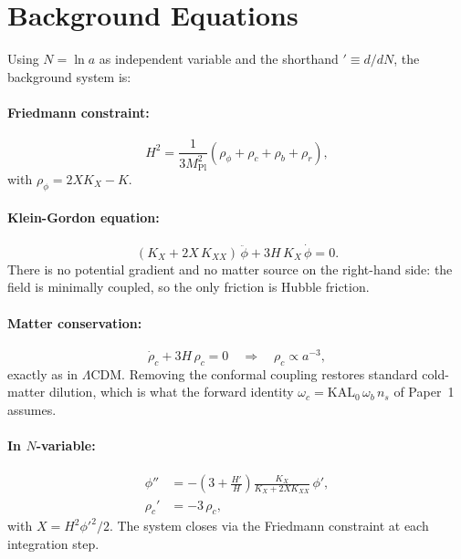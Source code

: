 \documentclass[12pt,a4paper]{article}
\newcommand{\KAL}{\mathrm{KAL}_0}
\newcommand{\Mpl}{M_{\mathrm{Pl}}}
\newcommand{\brac}[1]{\left(#1\right)}
\begin{document}
\section{Background Equations}
\label{sec:background}

Using $N = \ln a$ as independent variable and the shorthand
${}' \equiv d/dN$, the background system is:

\paragraph{Friedmann constraint:}
\begin{equation}
  H^2 = \frac{1}{3\Mpl^2}
        \brac{\rho_\phi + \rho_{c} + \rho_b + \rho_r},
  \label{eq:Friedmann}
\end{equation}
with $\rho_\phi = 2XK_X - K$.

\paragraph{Klein-Gordon equation:}
\begin{equation}
  \brac{K_X + 2X\,K_{XX}}\,\ddot\phi
  + 3H\,K_X\,\dot\phi
  = 0.
  \label{eq:KG}
\end{equation}
There is no potential gradient and no matter source on the right-hand
side: the field is minimally coupled, so the only friction is Hubble
friction.

\paragraph{Matter conservation:}
\begin{equation}
  \dot\rho_{c} + 3H\,\rho_{c} = 0
  \quad\Longrightarrow\quad
  \rho_{c} \propto a^{-3},
  \label{eq:rhoc}
\end{equation}
exactly as in $\Lambda$CDM.  Removing the conformal coupling restores
standard cold-matter dilution, which is what the forward identity
$\omega_c = \KAL\,\omega_b\,n_s$ of Paper~1 assumes.

\paragraph{In $N$-variable:}
\begin{align}
  \phi''  &= -\brac{3 + \frac{H'}{H}}
             \frac{K_X}{K_X + 2XK_{XX}}\,\phi',
  \label{eq:phi_N}\\[4pt]
  \rho_{c}' &= -3\,\rho_{c},
  \label{eq:rho_N}
\end{align}
with $X = H^2{\phi'}^2/2$.  The system closes via the Friedmann
constraint at each integration step.
\end{document}
